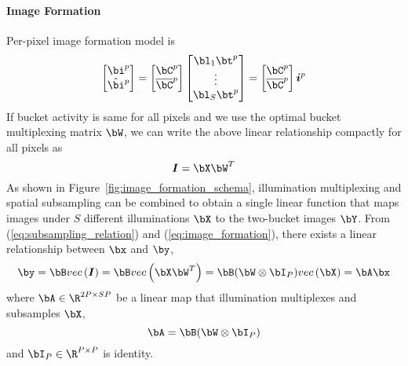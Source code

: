 \documentclass[../writeup.tex]{subfiles}
\begin{document}
\paragraph{Image Formation}
Per-pixel image formation model is
\[
    \begin{bmatrix}
        \bi^p \\ \hat{\bi}^p
    \end{bmatrix}
    = 
    \begin{bmatrix}
        \bC^p \\ \overline{\bC}^p
    \end{bmatrix}
    \begin{bmatrix}
        \bl_1 \bt^p \\ \vdots \\ \bl_S \bt^p
    \end{bmatrix}
    = 
    \begin{bmatrix}
        \bC^p \\ \overline{\bC}^p
    \end{bmatrix}
    \si^p
\]
If bucket activity is same for all pixels and we use the optimal bucket multiplexing matrix $\bW$, we can write the above linear relationship compactly for all pixels as
\begin{equation}
    \label{eq:image_formation}
    \sI = \bX \bW^T
\end{equation}
As shown in Figure~\ref{fig:image_formation_schema}, illumination multiplexing and spatial subsampling can be combined to obtain a single linear function that maps images under $S$ different illuminations $\bX$ to the two-bucket images $\bY$. From (\ref{eq:subsampling_relation}) and (\ref{eq:image_formation}), there exists a linear relationship between $\bx$ and $\by$, 
\begin{equation}
    \label{eq:linear_mapping}
    \by = \bB \vec{\sI} = \bB \vec{\bX \bW^T} = \bB(\bW \otimes \bI_P) \vec{\bX} = \bA\bx
\end{equation}
where $\bA \in \R^{2P\times SP}$ be a linear map that illumination multiplexes and subsamples $\bX$,
\[
    \bA = \bB(\bW\otimes \bI_P)
\]
and $\bI_P\in\R^{P\times P}$ is identity. 
\end{document}
